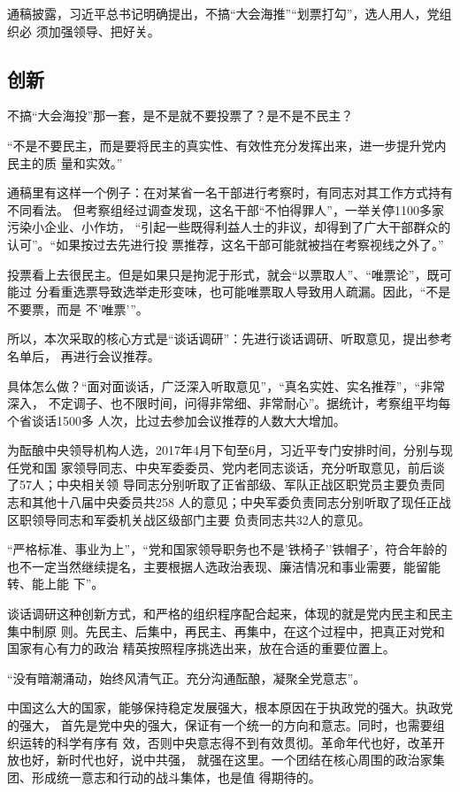 \documentclass[11pt]{ctexart}
\begin{document}
{{{{通稿披露，习近平总书记明确提出，不搞“大会海推”“划票打勾”，选人用人，党组织必
须加强领导、把好关。



\subsection{创新}
\label{sec:orgba23809}

不搞“大会海投”那一套，是不是就不要投票了？是不是不民主？

“不是不要民主，而是要将民主的真实性、有效性充分发挥出来，进一步提升党内民主的质
量和实效。”

通稿里有这样一个例子：在对某省一名干部进行考察时，有同志对其工作方式持有不同看法。
但考察组经过调查发现，这名干部“不怕得罪人”，一举关停1100多家污染小企业、小作坊，
“引起一些既得利益人士的非议，却得到了广大干部群众的认可”。“如果按过去先进行投
票推荐，这名干部可能就被挡在考察视线之外了。”

投票看上去很民主。但是如果只是拘泥于形式，就会“以票取人”、“唯票论”，既可能过
分看重选票导致选举走形变味，也可能唯票取人导致用人疏漏。因此，“不是不要票，而是
不’唯票’”。

所以，本次采取的核心方式是“谈话调研”：先进行谈话调研、听取意见，提出参考名单后，
再进行会议推荐。

具体怎么做？“面对面谈话，广泛深入听取意见”，“真名实姓、实名推荐”，“非常深入，
不定调子、也不限时间，问得非常细、非常耐心”。据统计，考察组平均每个省谈话1500多
人次，比过去参加会议推荐的人数大大增加。

为酝酿中央领导机构人选，2017年4月下旬至6月，习近平专门安排时间，分别与现任党和国
家领导同志、中央军委委员、党内老同志谈话，充分听取意见，前后谈了57人；中央相关领
导同志分别听取了正省部级、军队正战区职党员主要负责同志和其他十八届中央委员共258
人的意见；中央军委负责同志分别听取了现任正战区职领导同志和军委机关战区级部门主要
负责同志共32人的意见。

“严格标准、事业为上”，“党和国家领导职务也不是’铁椅子’’铁帽子’，符合年龄的
也不一定当然继续提名，主要根据人选政治表现、廉洁情况和事业需要，能留能转、能上能
下”。



谈话调研这种创新方式，和严格的组织程序配合起来，体现的就是党内民主和民主集中制原
则。先民主、后集中，再民主、再集中，在这个过程中，把真正对党和国家有心有力的政治
精英按照程序挑选出来，放在合适的重要位置上。

“没有暗潮涌动，始终风清气正。充分沟通酝酿，凝聚全党意志”。

中国这么大的国家，能够保持稳定发展强大，根本原因在于执政党的强大。执政党的强大，
首先是党中央的强大，保证有一个统一的方向和意志。同时，也需要组织运转的科学有序有
效，否则中央意志得不到有效贯彻。革命年代也好，改革开放也好，新时代也好，说中共强，
就强在这里。一个团结在核心周围的政治家集团、形成统一意志和行动的战斗集体，也是值
得期待的。

}}}}
\end{document}
